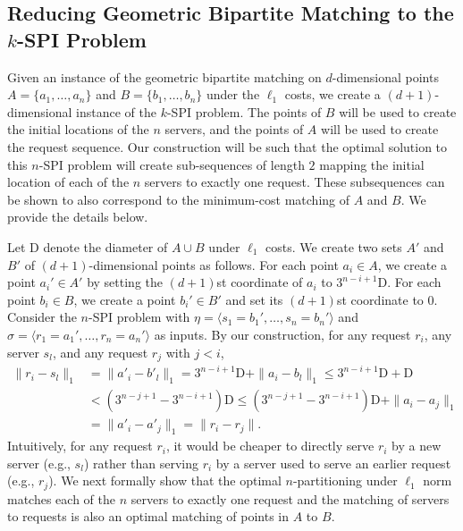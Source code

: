 \documentclass[11pt,onecolumn]{article}
\newcommand{\servers}{\eta}
\newcommand{\requests}{\sigma}
\newcommand{\diam}{\mathrm{D}}
\begin{document}
%

\subsection{Reducing Geometric Bipartite Matching to the \texorpdfstring{$k$}{}-SPI Problem}\label{sec:reduction}

Given an instance of the geometric bipartite matching on $d$-dimensional points $A=\{a_1,\ldots, a_n\}$ and $B=\{b_1,\ldots, b_n\}$ under the $\ell_1$ costs, we create a $(d+1)$-dimensional instance of the $k$-SPI problem. The points of $B$ will be used to create the initial locations of the $n$ servers, and the points of $A$ will be used to create the request sequence. Our construction will be such that the optimal solution to this $n$-SPI problem will create sub-sequences of length $2$ mapping the initial location of each of the $n$ servers to exactly one request. These subsequences can be shown to also correspond to the minimum-cost matching of $A$ and $B$. We provide the details below. 

Let $\diam$ denote the diameter of $A\cup B$ under $\ell_1$ costs. We create two sets $A'$ and $B'$ of $(d+1)$-dimensional points as follows. For each point $a_i \in A$, we create a point $a_i' \in A'$ by setting the $(d+1)$st coordinate of $a_i$ to $3^{n-i+1}\diam$. For each point $b_i \in B$, we create a point $b_i' \in B'$ and set its $(d+1)$st coordinate to $0$. Consider the $n$-SPI problem with $\servers=\langle s_1=b_1',\ldots, s_n=b_n'\rangle$ and $\requests=\langle r_1=a_1',\ldots, r_n=a_n'\rangle$ as inputs. By our construction, for any request $r_i$, any server $s_l$, and any request $r_j$ with $j<i$,
\begin{align}
    \|r_i- s_l\|_1 &= \|a'_i- b'_l\|_1 = 3^{n-i+1}\diam + \|a_i- b_l\|_1\le 3^{n-i+1}\diam + \diam \nonumber \\&<  (3^{n-j+1}-3^{n-i+1})\diam \le (3^{n-j+1}-3^{n-i+1})\diam + \|a_i- a_j\|_1 \nonumber \\&= \|a'_i- a'_j\|_1= \|r_i-r_j\|.\label{eq:distance-EBM}
\end{align}
Intuitively, for any request $r_i$, it would be cheaper to directly serve $r_i$ by a new server (e.g., $s_l$) rather than serving $r_i$ by a server used to serve an earlier request (e.g., $r_j$).
We next formally show that the optimal $n$-partitioning under $\ell_1$ norm matches each of the $n$ servers to exactly one request and the matching of servers to requests is also an optimal matching of points in $A$ to $B$. 
\end{document}
